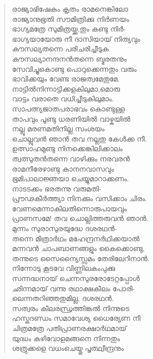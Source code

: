 \begin{verse}
രാജ്യാഭിഷേകം കൃതം രാമനെങ്കിലോ\\
രാജ്യാനുഭൂതി സൗമിത്രിക്കു നിര്‍ണയം\\
ഭാഗ്യമത്രേ സുമിത്രയ്ക്ക,തും കണ്ടു നിര്‍-\\
ഭാഗ്യയായോരു നീ ദാസിയായ് നിത്യവും\\
കൗസല്യതന്നെ പരിചരിച്ചീടുക\\
കൗസല്യാനന്ദനന്‍തന്നെ ബ്ഭരതനും\\
സേവിച്ചുകൊണ്ടു പൊറുക്കെന്നതും വരും\\
ഭാവിക്കയും വേണ്ട രാജത്വമേതുമേ.\\
നാട്ടില്‍നിന്നാട്ടിക്കളകിലുമാ,മൊരു\\
വാട്ടം വരാതെ വധിച്ചീടുകിലുമാം.\\
സാപത്ന്യജാതപരാഭവം കൊണ്ടുള്ള\\
താപവും പൂണ്ടു ധരണിയില്‍ വാഴ്കയില്‍\\
നല്ലൂ മരണമതിനില്ല സംശയം\\
ചൊല്ലുവന്‍ ഞാന്‍ തവ നല്ലതു കേള്‍ക്ക നീ.\\
ഉത്സാഹമുണ്ടു നിനക്കെങ്കിലിക്കാലം\\
ത്വത്സുതന്‍തന്നെ വാഴിക്കും നരവരന്‍\\
രാമനീരേഴാണ്ടു കാനനവാസവും\\
ഭൂമിപാലാജ്ഞയാ ചെയ്യുമാറാക്കണം.\\
നാടടക്കം ഭരതന്നു വരുമതി-\\
പ്രൗഢകീര്‍ത്ത്യാ നിനക്കും വസിക്കാം ചിരം.\\
വേണമെന്നാകിലതിന്നൊരുപായവും\\
പ്രാണസമേ! തവ ചൊല്ലിത്തരുവന്‍ ഞാന്‍.\\
മുന്നം സുരാസുരയുദ്ധേ ദശരഥന്‍-\\
തന്നെ മിത്രാര്‍ഥം മഹേന്ദ്രനര്‍ഥിക്കയാല്‍\\
മന്നവന്‍ ചാപബാണങ്ങളും കൈക്കൊണ്ടു,\\
തന്നുടെ സൈന്യൈസ്സമം തേരിലേറിനാന്‍.\\
നിന്നോടു കൂടവേ വിണ്ണിലകംപുക്കു\\
സന്നദ്ധനായ് ചെന്നസുരരോടേറ്റപ്പോള്‍\\
ഛിന്നമായ് വന്നു രഥാക്ഷകീലം പോരി-\\
ലെന്നതറിഞ്ഞതുമില്ല, ദശരഥന്‍.\\
സത്വരം കീലരന്ധ്രത്തിങ്കല്‍ നിന്നുടെ\\
ഹസ്തദണ്ഡം സമാവേശ്യ ധൈര്യേണ നീ\\
ചിത്രമത്രേ പതിപ്രാണരക്ഷാര്‍ഥമായ്\\
യുദ്ധം കഴിവോളമങ്ങനെ നിന്നതും\\
ശത്രുക്കളെ വധംചെയ്തു പൃത്ഥ്വീന്ദ്രനും\\

\end{verse}
